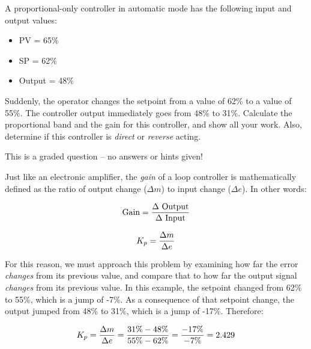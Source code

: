 

A proportional-only controller in automatic mode has the following input and output values:

\begin{itemize}
\item{} PV = 65\%
\item{} SP = 62\%
\item{} Output = 48\%
\end{itemize}

Suddenly, the operator changes the setpoint from a value of 62\% to a value of 55\%.  The controller output immediately goes from 48\% to 31\%.  Calculate the proportional band and the gain for this controller, and show all your work.  Also, determine if this controller is {\it direct} or {\it reverse} acting.

\vfil

\eject






This is a graded question -- no answers or hints given!







Just like an electronic amplifier, the {\it gain} of a loop controller is mathematically defined as the ratio of output change ($\Delta m$) to input change ($\Delta e$).  In other words:

$$\hbox{Gain} = {\Delta \hbox{ Output} \over \Delta \hbox{ Input}}$$

$$K_p = {\Delta m \over \Delta e}$$

For this reason, we must approach this problem by examining how far the error {\it changes} from its previous value, and compare that to how far the output signal {\it changes} from its previous value.  In this example, the setpoint changed from 62\% to 55\%, which is a jump of -7\%.  As a consequence of that setpoint change, the output jumped from 48\% to 31\%, which is a jump of -17\%.  Therefore:

$$K_p = {\Delta m \over \Delta e} = {31\% - 48\% \over 55\% - 62\%} = {-17\% \over -7\%} = 2.429$$

